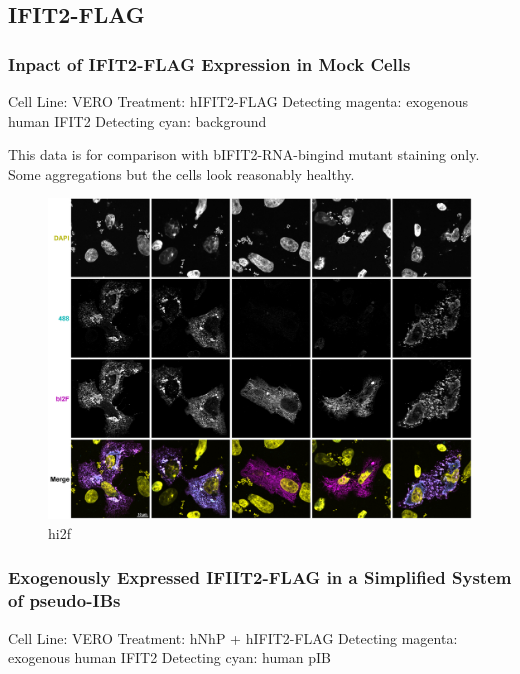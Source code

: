 \subsection{IFIT2-FLAG}
\subsubsection{Inpact of IFIT2-FLAG Expression in Mock Cells} \label{Inpact of IFIT2-FLAG Expression in Mock Cells}
Cell Line: VERO \newline
Treatment: hIFIT2-FLAG \newline
Detecting magenta: exogenous human IFIT2 \newline
Detecting cyan: background \newline

This data is for comparison with bIFIT2-RNA-bingind mutant staining only. Some aggregations but the cells look reasonably healthy.

\begin{figure}
    \centering
    \includegraphics[width=1\linewidth]{10. Chapter 5//Figs//03. IFIT2-FLAG/01. hi2f mock.png}
    \caption[hi2f]{hi2f}
    \label{hi2f}
\end{figure}


\subsubsection{Exogenously Expressed IFIIT2-FLAG in a Simplified System of pseudo-IBs} \label{Exogenously Expressed IFIIT2-FLAG in a Simplified System of pseudo-IBs}
Cell Line: VERO \newline
Treatment: hNhP + hIFIT2-FLAG \newline
Detecting magenta: exogenous human IFIT2 \newline
Detecting cyan: human pIB \newline

